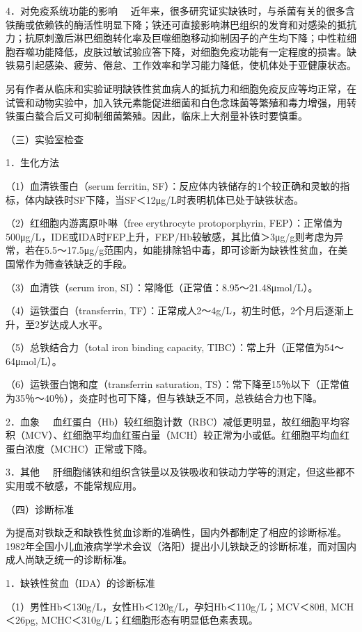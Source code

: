 {4．对免疫系统功能的影响}
　近年来，很多研究证实缺铁时，与杀菌有关的很多含铁酶或依赖铁的酶活性明显下降；铁还可直接影响淋巴组织的发育和对感染的抵抗力；抗原刺激后淋巴细胞转化率及巨噬细胞移动抑制因子的产生均下降；中性粒细胞吞噬功能降低，皮肤过敏试验应答下降，对细胞免疫功能有一定程度的损害。缺铁易引起感染、疲劳、倦怠、工作效率和学习能力降低，使机体处于亚健康状态。

另有作者从临床和实验证明缺铁性贫血病人的抵抗力和细胞免疫反应等均正常，在试管和动物实验中，加入铁元素能促进细菌和白色念珠菌等繁殖和毒力增强，用转铁蛋白螯合后又可抑制细菌繁殖。因此，临床上大剂量补铁时要慎重。

（三）实验室检查

{1．生化方法}

（1）血清铁蛋白（serum ferritin,
SF）：反应体内铁储存的1个较正确和灵敏的指标，体内缺铁时SF下降，当SF＜12μg/L时表明机体已处于缺铁状态。

（2）红细胞内游离原卟啉（free erythrocyte protoporphyrin,
FEP）：正常值为500μg/L，IDE或IDA时FEP上升，FEP/Hb较敏感，其比值＞3μg/g则考虑为异常，若在5.5～17.5μg/g范围内，如能排除铅中毒，即可诊断为缺铁性贫血，在美国常作为筛查铁缺乏的手段。

（3）血清铁（serum iron, SI）：常降低（正常值：8.95～21.48μmol/L）。

（4）运铁蛋白（transferrin,
TF）：正常成人2～4g/L，初生时低，2个月后逐渐上升，至2岁达成人水平。

（5）总铁结合力（total iron binding capacity,
TIBC）：常上升（正常值为54～64μmol/L）。

（6）运铁蛋白饱和度（transferrin saturation,
TS）：常下降至15％以下（正常值为35％～40％），炎症时也可下降，但与铁缺乏不同，总铁结合力也下降。

{2．血象}
　血红蛋白（Hb）较红细胞计数（RBC）减低更明显，故红细胞平均容积（MCV）、红细胞平均血红蛋白量（MCH）较正常为小或低。红细胞平均血红蛋白浓度（MCHC）正常或下降。

{3．其他}
　肝细胞储铁和组织含铁量以及铁吸收和铁动力学等的测定，但这些都不实用或不敏感，不能常规应用。

（四）诊断标准

为提高对铁缺乏和缺铁性贫血诊断的准确性，国内外都制定了相应的诊断标准。1982年全国小儿血液病学学术会议（洛阳）提出小儿铁缺乏的诊断标准，而对国内成人尚缺乏统一的诊断标准。

{1．缺铁性贫血（IDA）的诊断标准}

（1）男性Hb＜130g/L，女性Hb＜120g/L，孕妇Hb＜110g/L；MCV＜80fl,
MCH＜26pg, MCHC＜310g/L；红细胞形态有明显低色素表现。

